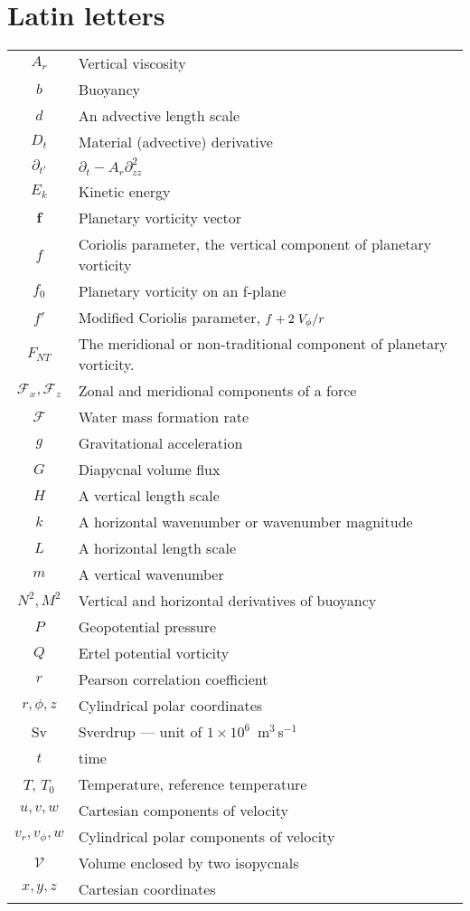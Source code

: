 \section*{Latin letters}
\begin{longtable}{cp{\textwidth}}
    $A_r$ & Vertical viscosity \\
    $b$ & Buoyancy \\
    $d$ & An advective length scale \\
    $D_t$ & Material (advective) derivative \\
    $\partial_{t'}$ & $\partial_t - A_r \partial^2_{zz}$ \\
    $E_k$ & Kinetic energy \\
    $\mathbf{f}$ & Planetary vorticity vector \\
    $f$ & Coriolis parameter, the vertical component of planetary vorticity \\
    $f_0$ & Planetary vorticity on an f-plane \\
    $f'$ & Modified Coriolis parameter, $f + 2 \flatfrac{V_\phi}{r}$ \\
    $F_{NT}$ & The meridional or non-traditional component of planetary vorticity. \\
    $\mathcal{F}_x, \mathcal{F}_z$ & Zonal and meridional components of a force \\
    $\mathscr{F}$ & Water mass formation rate \\
    $g$ & Gravitational acceleration \\
    $G$ & Diapycnal volume flux \\
    $H$ & A vertical length scale \\
    $k$ & A horizontal wavenumber or wavenumber magnitude \\
    $L$ & A horizontal length scale \\
    $m$ & A vertical wavenumber \\
    $N^2, M^2$ & Vertical and horizontal derivatives of buoyancy \\
    $P$ & Geopotential pressure \\
    $Q$ & Ertel potential vorticity \\
    $r$ & Pearson correlation coefficient \\
    $r, \phi, z$ & Cylindrical polar coordinates \\
    Sv & Sverdrup --- unit of $1 \times 10^{6}$~m$^3$\,s$^{-1}$ \\
    $t$ & time \\
    $T$, $T_0$ & Temperature, reference temperature \\
    $u, v, w$ & Cartesian components of velocity \\
    $v_r, v_\phi, w$ & Cylindrical polar components of velocity \\
    $\mathcal{V}$ & Volume enclosed by two isopycnals \\
    $x, y, z$ & Cartesian coordinates \\
\end{longtable}
    
